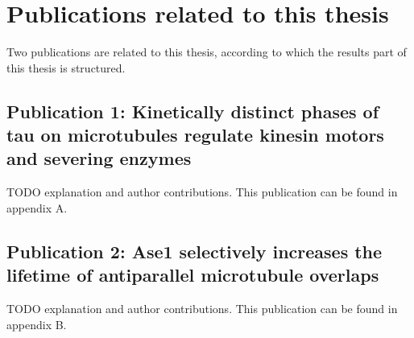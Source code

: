 \chapter{Publications related to this thesis}
\label{publications}
Two publications are related to this thesis, according to which the results part of this thesis is structured.
\section{Publication 1: Kinetically distinct phases of tau on microtubules regulate kinesin motors and severing enzymes}
TODO explanation and author contributions.
This publication can be found in appendix A.
\section{Publication 2: Ase1 selectively increases the lifetime of antiparallel microtubule overlaps}
TODO explanation and author contributions.
This publication can be found in appendix B.